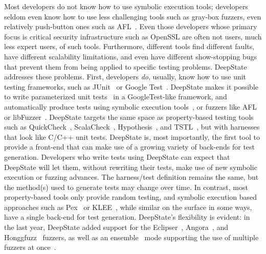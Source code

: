 Most developers do not know how to use symbolic execution tools; developers seldom even know how to use less challenging tools such as gray-box fuzzers, even relatively push-button ones such as AFL~\cite{aflfuzz}.  Even those developers whose primary focus is critical security infrastructure such as OpenSSL are often not users, much less expert users, of such tools.  Furthermore, different tools find different faults, have different scalability limitations, and even have different show-stopping bugs that prevent them from being applied to specific testing problems.  DeepState~\cite{DeepState,DeepStateTutorial} addresses these problems.  First, developers \emph{do}, usually, know how to use unit testing frameworks, such as JUnit~\cite{JUnit} or Google Test~\cite{GoogleTest}. DeepState makes it possible to write parameterized unit tests~\cite{ParamUnit} in a GoogleTest-like framework, and automatically produce tests using symbolic execution tools~\cite{angr1,angr2,angr3,Manticore}, or fuzzers like AFL~\cite{aflfuzz} or libFuzzer~\cite{libFuzzer}.  DeepState targets the same space as property-based testing tools such as QuickCheck~\cite{ClaessenH00}, ScalaCheck~\cite{ScalaCheckDoc}, Hypothesis~\cite{Hypothesis}, and TSTL~\cite{NFM15,tstlsttt}, but with harnesses that look like C/C++ unit tests. DeepState is, most importantly, the first tool to provide a front-end that can make use of a growing variety of back-ends for test generation.  Developers who write tests using DeepState can expect that DeepState will let them, without rewriting their tests, make use of new symbolic execution or fuzzing advances.  The harness/test definition remains the same, but the method(s) used to generate tests may change over time.  In contrast, most property-based tools only provide random testing, and symbolic execution based approaches such as Pex~\cite{Pex,UnitMeister} or KLEE~\cite{KLEE}, while similar on the surface in some ways, have a single back-end for test generation. DeepState's flexibility is evident: in the last year, DeepState added support for the Eclipser~\cite{eclipser}, Angora~\cite{angora}, and Honggfuzz~\cite{Honggfuzz} fuzzers, as well as an ensemble~\cite{enfuzz} mode  supporting  the use  of multiple fuzzers at once~\cite{ensemble}.


